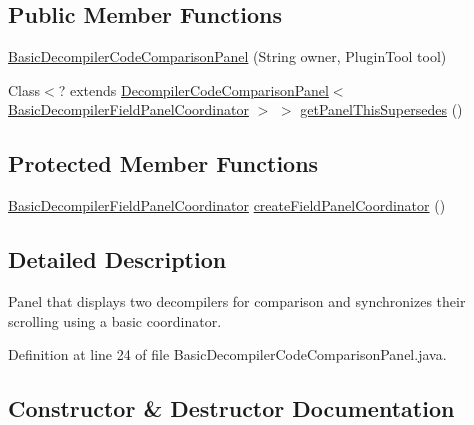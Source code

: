 \subsection*{Public Member Functions}
\begin{DoxyCompactItemize}
\item 
\mbox{\hyperlink{classghidra_1_1app_1_1decompiler_1_1component_1_1_basic_decompiler_code_comparison_panel_a404d2b301143c74ae335a09f5e1212bb}{Basic\+Decompiler\+Code\+Comparison\+Panel}} (String owner, Plugin\+Tool tool)
\item 
Class$<$? extends \mbox{\hyperlink{classghidra_1_1app_1_1decompiler_1_1component_1_1_decompiler_code_comparison_panel}{Decompiler\+Code\+Comparison\+Panel}}$<$ \mbox{\hyperlink{classghidra_1_1app_1_1decompiler_1_1component_1_1_basic_decompiler_field_panel_coordinator}{Basic\+Decompiler\+Field\+Panel\+Coordinator}} $>$ $>$ \mbox{\hyperlink{classghidra_1_1app_1_1decompiler_1_1component_1_1_basic_decompiler_code_comparison_panel_af5d5e3fec6ca1b693dd82f81533671ef}{get\+Panel\+This\+Supersedes}} ()
\end{DoxyCompactItemize}
\subsection*{Protected Member Functions}
\begin{DoxyCompactItemize}
\item 
\mbox{\hyperlink{classghidra_1_1app_1_1decompiler_1_1component_1_1_basic_decompiler_field_panel_coordinator}{Basic\+Decompiler\+Field\+Panel\+Coordinator}} \mbox{\hyperlink{classghidra_1_1app_1_1decompiler_1_1component_1_1_basic_decompiler_code_comparison_panel_a15be0eb845deaaac97dc51f9771da887}{create\+Field\+Panel\+Coordinator}} ()
\end{DoxyCompactItemize}


\subsection{Detailed Description}
Panel that displays two decompilers for comparison and synchronizes their scrolling using a basic coordinator. 

Definition at line 24 of file Basic\+Decompiler\+Code\+Comparison\+Panel.\+java.



\subsection{Constructor \& Destructor Documentation}
\mbox{\label{classghidra_1_1app_1_1decompiler_1_1component_1_1_basic_decompiler_code_comparison_panel_a404d2b301143c74ae335a09f5e1212bb}} 
